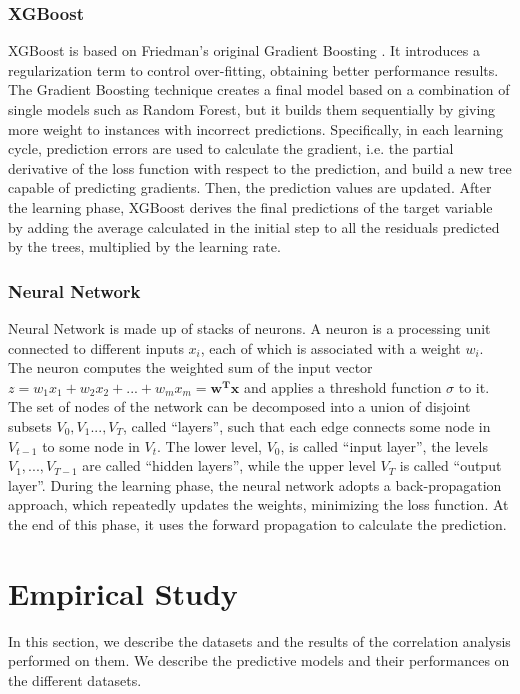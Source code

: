 \documentclass[review]{elsarticle}
\begin{document}
\subsubsection{XGBoost}
XGBoost is based on Friedman's original Gradient Boosting \cite{friedman2002stochastic,friedman2001greedy}. It introduces a regularization term to control over-fitting, obtaining better performance results. The Gradient Boosting technique creates a final model based on a combination of single models such as Random Forest, but it builds them sequentially by giving more weight to instances with incorrect predictions. Specifically, in each learning cycle, prediction errors are used to calculate the gradient, i.e. the partial derivative of the loss function with respect to the prediction, and build a new tree capable of predicting gradients. Then, the prediction values are updated. After the learning phase, XGBoost derives the final predictions of the target variable by adding the average calculated in the initial step to all the residuals predicted by the trees, multiplied by the learning rate.

\subsubsection{Neural Network}
Neural Network \cite {shalev2014understanding} is made up of stacks of neurons. A neuron is a processing unit connected to different inputs $ x_{i} $, each of which is associated with a weight $ w_{i} $. The neuron computes the weighted sum of the input vector $ z = w_{1} x_{1} + w_{2} x_{2} + ... + w_{m} x_{m} = \mathbf {w^{ T} x} $ and applies a threshold function $ \sigma $ to it. The set of nodes of the network can be decomposed into a union of disjoint subsets $ V_{0}, V_{1} ..., V_{T} $, called “layers”, such that each edge connects some node in $ V_{t-1} $ to some node in $ V_{t} $. The lower level, $ V_{0} $, is called “input layer”, the levels $ V_{1}, ..., V_{T-1} $ are called “hidden layers”, while the upper level $ V_{T} $ is called “output layer”. During the learning phase, the neural network adopts a back-propagation approach, which repeatedly updates the weights, minimizing the loss function. At the end of this phase, it uses the forward propagation to calculate the prediction.

\section{Empirical Study}
In this section, we describe the datasets and the results of the correlation analysis performed on them. We describe  the predictive models and their performances on the different datasets.
\end{document}
